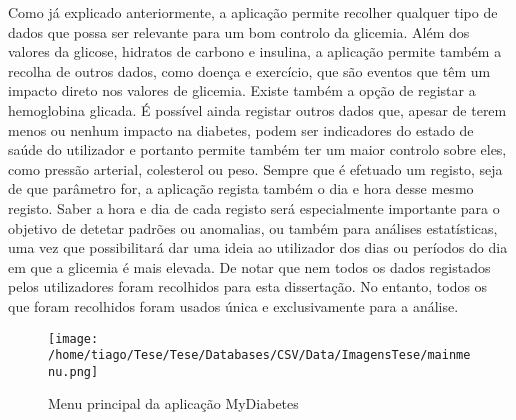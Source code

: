 Como já explicado anteriormente, a aplicação permite recolher qualquer tipo de dados que possa ser relevante para um bom controlo da glicemia. Além dos valores da glicose, hidratos de carbono e insulina, a aplicação permite também a recolha de outros dados, como doença e exercício, que são eventos que têm um impacto direto nos valores de glicemia. Existe também a opção de registar a hemoglobina glicada. É possível ainda registar outros dados que, apesar de terem menos ou nenhum impacto na diabetes, podem ser indicadores do estado de saúde do utilizador e portanto permite também ter um maior controlo sobre eles, como pressão arterial, colesterol ou peso.
Sempre que é efetuado um registo, seja de que parâmetro for, a aplicação regista também o dia e hora desse mesmo registo. Saber a hora e dia de cada registo será especialmente importante para o objetivo de detetar padrões ou anomalias, ou também para análises estatísticas, uma vez que possibilitará dar uma ideia ao utilizador dos dias ou períodos do dia em que a glicemia é mais elevada. De notar que nem todos os dados registados pelos utilizadores foram recolhidos para esta dissertação. No entanto, todos os que foram recolhidos foram usados única e exclusivamente para a análise. 

\begin{figure}[H]
\centering
\texttt{[image: /home/tiago/Tese/Tese/Databases/CSV/Data/ImagensTese/mainmenu.png]}
\caption{Menu principal da aplicação MyDiabetes}
\end{figure}
